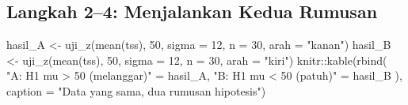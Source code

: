 \documentclass[
  indonesian,
  letterpaper,
]{book}
\newenvironment{Shaded}{\begin{snugshade}}{\end{snugshade}}
\newcommand{\AttributeTok}[1]{\textcolor[rgb]{0.40,0.45,0.13}{#1}}
\newcommand{\DecValTok}[1]{\textcolor[rgb]{0.68,0.00,0.00}{#1}}
\newcommand{\FunctionTok}[1]{\textcolor[rgb]{0.28,0.35,0.67}{#1}}
\newcommand{\NormalTok}[1]{\textcolor[rgb]{0.00,0.23,0.31}{#1}}
\newcommand{\OtherTok}[1]{\textcolor[rgb]{0.00,0.23,0.31}{#1}}
\newcommand{\SpecialCharTok}[1]{\textcolor[rgb]{0.37,0.37,0.37}{#1}}
\newcommand{\StringTok}[1]{\textcolor[rgb]{0.13,0.47,0.30}{#1}}
\begin{document}
\subsection{Langkah 2--4: Menjalankan Kedua
Rumusan}\label{langkah-24-menjalankan-kedua-rumusan}

\begin{Shaded}
\begin{Highlighting}[]
\NormalTok{hasil\_A }\OtherTok{\textless{}{-}} \FunctionTok{uji\_z}\NormalTok{(}\FunctionTok{mean}\NormalTok{(tss), }\DecValTok{50}\NormalTok{, }\AttributeTok{sigma =} \DecValTok{12}\NormalTok{, }\AttributeTok{n =} \DecValTok{30}\NormalTok{, }\AttributeTok{arah =} \StringTok{"kanan"}\NormalTok{)}
\NormalTok{hasil\_B }\OtherTok{\textless{}{-}} \FunctionTok{uji\_z}\NormalTok{(}\FunctionTok{mean}\NormalTok{(tss), }\DecValTok{50}\NormalTok{, }\AttributeTok{sigma =} \DecValTok{12}\NormalTok{, }\AttributeTok{n =} \DecValTok{30}\NormalTok{, }\AttributeTok{arah =} \StringTok{"kiri"}\NormalTok{)}
\NormalTok{knitr}\SpecialCharTok{::}\FunctionTok{kable}\NormalTok{(}\FunctionTok{rbind}\NormalTok{(}
  \StringTok{"A: H1 mu \textgreater{} 50 (melanggar)"} \OtherTok{=}\NormalTok{ hasil\_A,}
  \StringTok{"B: H1 mu \textless{} 50 (patuh)"}     \OtherTok{=}\NormalTok{ hasil\_B}
\NormalTok{), }\AttributeTok{caption =} \StringTok{"Data yang sama, dua rumusan hipotesis"}\NormalTok{)}
\end{Highlighting}
\end{Shaded}
\end{document}
